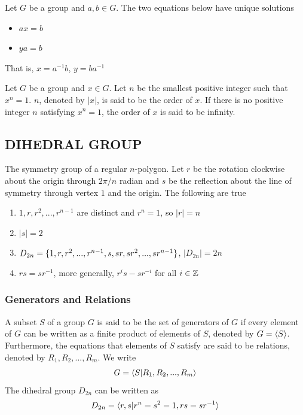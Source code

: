 \begin{proposition}
	Let $G$ be a group and $a, b \in G$. The two equations below have unique solutions
	\begin{itemize}
		\item $ax = b$
		\item $ya = b$
	\end{itemize}
	That is, $x = a^{-1} b$, $y = b a^{-1}$
\end{proposition}

\begin{definition}
	Let $G$ be a group and $x \in G$. Let $n$ be the smallest positive integer such that $x^n = 1$. $n$, denoted by $|x|$, is said to be the order of $x$. If there is no positive integer $n$ satisfying $x^n = 1$, the order of $x$ is said to be infinity.
\end{definition}

\subsection{DIHEDRAL GROUP}

\begin{definition}
	The symmetry group of a regular $n$-polygon. Let $r$ be the rotation clockwise about the origin through $2\pi/n$ radian and $s$ be the reflection about the line of symmetry through vertex $1$ and the origin. The following are true
	\begin{enumerate}
		\item $1, r, r^2, ..., r^{n-1}$ are distinct and $r^n = 1$, so $|r| = n$
		\item $|s| = 2$
		\item $D_{2n} = \{1, r, r^2, ..., r^{n-1}, s, sr, sr^2, ..., sr^{n-1}\}$, $|D_{2n}| = 2n$
		\item $rs = sr^{-1}$, more generally, $r^is - sr^{-i}$ for all $i \in \mathbb{Z}$
	\end{enumerate}
\end{definition}

\subsubsection{Generators and Relations}

\begin{definition}
	A subset $S$ of a group $G$ is said to be the set of generators of $G$ if every element of $G$ can be written as a finite product of elements of $S$, denoted by $G = \langle S\rangle$.
	Furthermore, the equations that elements of $S$ satisfy are said to be relations, denoted by $R_1, R_2, ..., R_m$. We write
	\[
	G = \langle S | R_1, R_2, ..., R_m\rangle
	\]
	The dihedral group $D_{2n}$ can be written as 
	\[
	D_{2n} = \langle r, s | r^n = s^2 = 1, rs = sr^{-1}\rangle
	\]
\end{definition}

